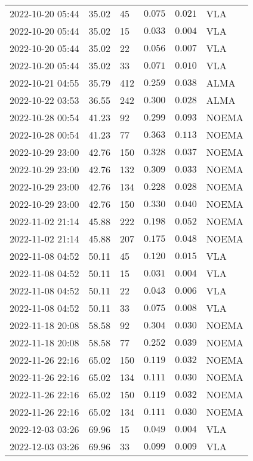 \documentclass{nature_plusfigure}
\begin{document}
\begin{supplement}
\begin{center}
\begin{longtable}{llllll}
2022-10-20 05:44 & 35.02 & 45 & $0.075$ & $0.021$ & VLA \\ 
2022-10-20 05:44 & 35.02 & 15 & $0.033$ & $0.004$ & VLA \\ 
2022-10-20 05:44 & 35.02 & 22 & $0.056$ & $0.007$ & VLA \\ 
2022-10-20 05:44 & 35.02 & 33 & $0.071$ & $0.010$ & VLA \\ 
2022-10-21 04:55 & 35.79 & 412 & $0.259$ & $0.038$ & ALMA \\ 
2022-10-22 03:53 & 36.55 & 242 & $0.300$ & $0.028$ & ALMA \\  
2022-10-28 00:54 & 41.23 & 92 & $0.299$ & $0.093$ & NOEMA \\ 
2022-10-28 00:54 & 41.23 & 77 & $0.363$ & $0.113$ & NOEMA \\ 
2022-10-29 23:00 & 42.76 & 150 & $0.328$ & $0.037$ & NOEMA \\ 
2022-10-29 23:00 & 42.76 & 132 & $0.309$ & $0.033$ & NOEMA \\ 
2022-10-29 23:00 & 42.76 & 134 & $0.228$ & $0.028$ & NOEMA \\ 
2022-10-29 23:00 & 42.76 & 150 & $0.330$ & $0.040$ & NOEMA \\ 
2022-11-02 21:14 & 45.88 & 222 & $0.198$ & $0.052$ & NOEMA \\ 
2022-11-02 21:14 & 45.88 & 207 & $0.175$ & $0.048$ & NOEMA \\ 
2022-11-08 04:52 & 50.11 & 45 & $0.120$ & $0.015$ & VLA \\ 
2022-11-08 04:52 & 50.11 & 15 & $0.031$ & $0.004$ & VLA \\ 
2022-11-08 04:52 & 50.11 & 22 & $0.043$ & $0.006$ & VLA \\ 
2022-11-08 04:52 & 50.11 & 33 & $0.075$ & $0.008$ & VLA \\ 
2022-11-18 20:08 & 58.58 & 92 & $0.304$ & $0.030$ & NOEMA \\ 
2022-11-18 20:08 & 58.58 & 77 & $0.252$ & $0.039$ & NOEMA \\ 
2022-11-26 22:16 & 65.02 & 150 & $0.119$ & $0.032$ & NOEMA \\ 
2022-11-26 22:16 & 65.02 & 134 & $0.111$ & $0.030$ & NOEMA \\ 
2022-11-26 22:16 & 65.02 & 150 & $0.119$ & $0.032$ & NOEMA \\ 
2022-11-26 22:16 & 65.02 & 134 & $0.111$ & $0.030$ & NOEMA \\ 
2022-12-03 03:26 & 69.96 & 15 & $0.049$ & $0.004$ & VLA \\ 
2022-12-03 03:26 & 69.96 & 33 & $0.099$ & $0.009$ & VLA \\ 

\end{longtable}
\end{center}
\end{supplement}
\end{document}
